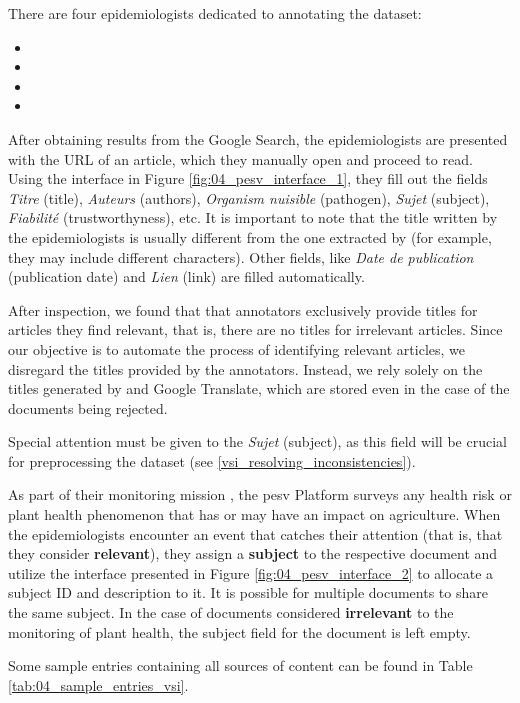There are four epidemiologists dedicated to annotating the dataset: 

\begin{itemize}
    \item {}
    \item {}
    \item {}
    \item {}
\end{itemize}


After obtaining results from the Google Search, the epidemiologists are presented with the URL of an article, which they manually open and proceed to read. Using the interface in Figure \ref{fig:04_pesv_interface_1}, they fill out the fields \emph{Titre} (title), \emph{Auteurs} (authors), \emph{Organism nuisible} (pathogen), \emph{Sujet} (subject), \emph{Fiabilité} (trustworthyness), etc. 
It is important to note that the title written by the epidemiologists is usually different from the one extracted by \trafilatura{} (for example, they may include different characters). Other fields, like \emph{Date de publication} (publication date) and \emph{Lien} (link) are filled automatically.

After inspection, we found that that annotators exclusively provide titles for articles they find relevant, that is, there are no titles for irrelevant articles. Since our objective is to automate the process of identifying relevant articles, we disregard the titles provided by the annotators. Instead, we rely solely on the titles generated by \trafilatura{} and Google Translate, which are stored even in the case of the documents being rejected.

Special attention must be given to the \emph{Sujet} (subject), as this field will be crucial for preprocessing the dataset (see \headerName{} \ref{vsi_resolving_inconsistencies}).

\begin{tcolorbox}[colback=mylightblue,colframe=gray!50!black]
As part of their monitoring mission , the \gls{pesv} Platform surveys any health risk or plant health phenomenon that has or may have an impact on agriculture. 
When the epidemiologists encounter an event that catches their attention (that is, that they consider \textbf{relevant}), they assign a \textbf{subject} to the respective document and utilize the interface presented in Figure \ref{fig:04_pesv_interface_2} to allocate a subject ID and description to it. It is possible for multiple documents to share the same subject. In the case of documents considered \textbf{irrelevant} to the monitoring of plant health, the subject field for the document is left empty.
\end{tcolorbox}
Some sample entries containing all sources of content can be found in Table \ref{tab:04_sample_entries_vsi}.

